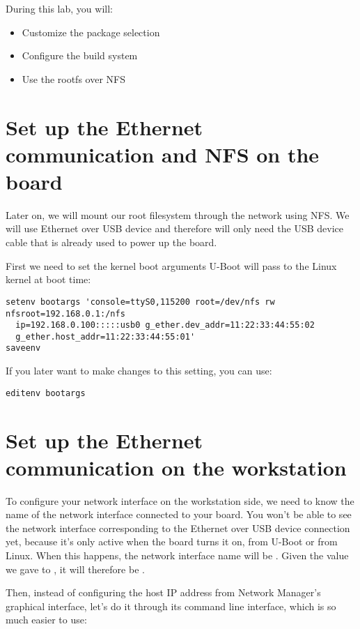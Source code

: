 
During this lab, you will:
\begin{itemize}
  \item Customize the package selection
  \item Configure the build system
  \item Use the rootfs over NFS
\end{itemize}

\section{Set up the Ethernet communication and NFS on the board}

Later on, we will mount our root filesystem through the network using
NFS. We will use Ethernet over USB device and therefore will only need
the USB device cable that is already used to power up the board.

First we need to set the kernel boot arguments U-Boot will pass to the
Linux kernel at boot time:
\begin{verbatim}
setenv bootargs 'console=ttyS0,115200 root=/dev/nfs rw nfsroot=192.168.0.1:/nfs
  ip=192.168.0.100:::::usb0 g_ether.dev_addr=11:22:33:44:55:02
  g_ether.host_addr=11:22:33:44:55:01'
saveenv
\end{verbatim}

If you later want to make changes to this setting, you can use:
\begin{verbatim}
editenv bootargs
\end{verbatim}

\section{Set up the Ethernet communication on the workstation}

To configure your network interface on the workstation side, we need
to know the name of the network interface connected to your board. You
won't be able to see the network interface corresponding to the
Ethernet over USB device connection yet, because it's only active when
the board turns it on, from U-Boot or from Linux. When this happens,
the network interface name will be . Given the
value we gave to , it will therefore be
.

Then, instead of configuring the host IP address from Network
Manager's graphical interface, let's do it through its command line
interface, which is so much easier to use:

